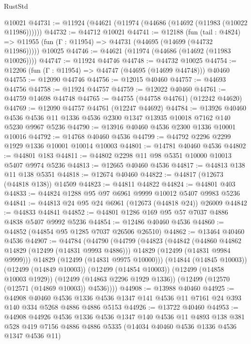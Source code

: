 \begin{lexlean}{RustStd}
\begin{coremodule}
    @10021
@44731 := @11924 (@44621 (@11974 (@44686 (@14692 (@11983 (@10022 @11986))))))
@44732 := @44712 @10021
@44741 := @12188
    (fun (tail : @4824) => @11955 (fun (Γ : @11954) => @44731 (@44695 (@14699 (@44732 @11986)))))
    @10025
@44746 := @44621 (@11974 (@44686 (@14692 (@11983 @10026))))
@44747 := @11924 @44746
@44748 := @44732 @10025
@44754 := @12206 (fun (Γ : @11954) => @44747 (@44695 (@14699 @44748))) @40460
@44755 := @12090 @44746
@44756 := @12015 @40460
@44757 := @44693 @44756
@44758 := @11924 @44757
@44759 := @12022 @40460
@44761 := @44759 @14698 @44748
@44765 := @44755 (@44758 @44761) (@12242 @44620)
@44769 := @12090 @44757 @44761 (@12247 @44692)
@44784 := @13926
    @40460
    @4536
    @4536
    @11
    @1336
    @4536
    @2300
    @1347
    @13935
    @10018
    @7162
    @140
    @5230
    @9967
    @5236
@44790 := @13916 @40460 @4536 @2300 @1336 @10001 @10016
@44792 := @14768 @40460 @4536
@44799 := @44792 @2296 @2299 @1929 @1336 @10001 @10014 @10003
@44801 := @14781 @40460 @4536
@44802 := @44801 @183
@44811 := @44802 @2298 @11 @98 @5351 @10000 @10013 @5407 @9974 @5236
@44813 := @12665 @40460 @4536
@44817 := @44813 @138 @11 @138 @5351
@44818 := @12674 @40460
@44822 := @44817 (@12673 (@44818 @138)) @14509
@44823 := @44811 @44822
@44824 := @44801 @403
@44833 := @44824 @1288 @95 @97 @6961 @9999 @10012 @5407 @9983 @5236
@44841 := @44813 @24 @95 @24 @6961 (@12673 (@44818 @24)) @26009
@44842 := @44833 @44841
@44852 := @44801 @1286 @169 @95 @57 @7037 @4886 @4838 @5407 @9992 @5236
@44854 := @12486 @40460 @4536
@44860 := @44852 (@44854 @95 @1285 @7037 @26506 @26510)
@44862 := @13464 @40460 @4536
@44907 := @44784
    (@44790
      (@44799
        (@44823
          (@44842
            (@44860 @44862 @14829 (@12499 (@14831 @9993 @4886)))
            @14829
            (@12499 (@14831 @9984 @9999)))
          @14829
          (@12499 (@14831 @9975 @10000)))
        (@14844 (@14845 @10003))
        (@12499 (@14849 @10003))
        (@12499 (@14854 @10003))
        (@12499 (@14858 @10003 @1929))
        (@12499 (@14863 @2296 @1929 @1336))
        (@12499 (@12570 (@12571 (@14869 @10003)) @4536))))
@44908 := @13988 @40460
@44925 := @44908
    @40460
    @4536
    @1336
    @4536
    @1347
    @141
    @4536
    @11
    @7161
    @24
    @393
    @140
    @334
    @5268
    @4886
    @4886
    @5153
@44926 := @13722 @40460
@44953 := @44908
    @44926
    @4536
    @1336
    @4536
    @1347
    @140
    @4536
    @11
    @4893
    @138
    @381
    @528
    @419
    @7156
    @4886
    @4886
    @5335
    (@14034 @40460 @4536 @1336 @4536 @1347 @4536 @11)

\end{coremodule}
\end{lexlean}
